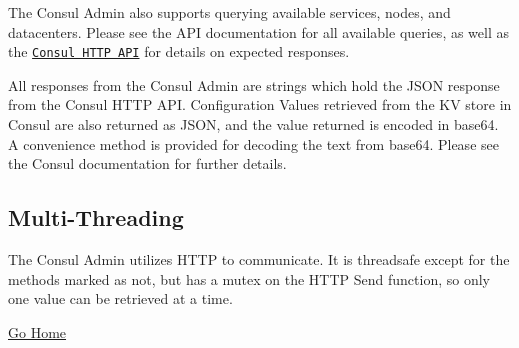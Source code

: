 The Consul Admin also supports querying available services, nodes, and datacenters. Please see the A\+PI documentation for all available queries, as well as the \href{https://www.consul.io/api/index.html}{\tt Consul H\+T\+TP A\+PI} for details on expected responses.

All responses from the Consul Admin are strings which hold the J\+S\+ON response from the Consul H\+T\+TP A\+PI. Configuration Values retrieved from the KV store in Consul are also returned as J\+S\+ON, and the value returned is encoded in base64. A convenience method is provided for decoding the text from base64. Please see the Consul documentation for further details.

\subsection*{Multi-\/\+Threading}

The Consul Admin utilizes H\+T\+TP to communicate. It is threadsafe except for the methods marked as not, but has a mutex on the H\+T\+TP Send function, so only one value can be retrieved at a time.

\hyperlink{index}{Go Home} 